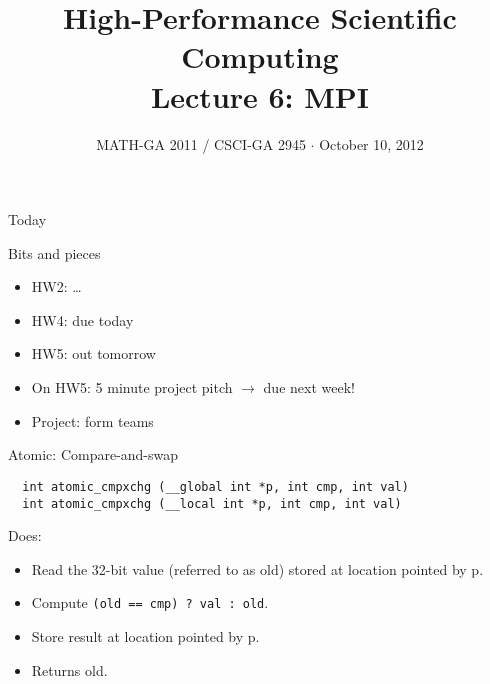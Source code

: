 \documentclass[english,compress]{beamer}
\begin{document}

\title{High-Performance Scientific Computing\\Lecture 6: MPI}

\date{MATH-GA 2011 / CSCI-GA 2945 $\cdot$ October 10, 2012}

\frame{\titlepage}

\begin{frame}{Today}
  \tableofcontents[hideallsubsections]
\end{frame}
\begin{frame}{Bits and pieces}
  \begin{itemize}
    \item HW2: \dots
    \item HW4: due today
    \item HW5: out tomorrow
    \item On HW5: 5 minute project pitch $\rightarrow$ due next week!
    \item Project: form teams
  \end{itemize}
\end{frame}
\begin{frame}[fragile]{Atomic: Compare-and-swap}
  \begin{lstlisting}
  int atomic_cmpxchg (__global int *p, int cmp, int val)
  int atomic_cmpxchg (__local int *p, int cmp, int val)
  \end{lstlisting}

  Does:
  \begin{itemize}
    \item Read the 32-bit value (referred to as
    old) stored at location pointed by p.
  \item Compute \texttt{(old == cmp) ? val : old}.
  \item Store result at location pointed by p.
  \item Returns old.
  \end{itemize}
\end{frame}
\end{document}
